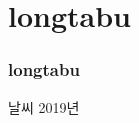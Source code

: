 \documentclass[12pt, a4paper, oneside]{book}
\let\stdsection\section
\renewcommand\section{\newpage\stdsection}
\begin{document}
										


	\part{longtabu}
	\noptcrule
	\parttoc				



		\section{	longtabu}				


				\begin{table} [h]																	
				\caption{		날씨 2019년}										
				\label{tab:title}																	
				\end{table}												
					
\end{document}
